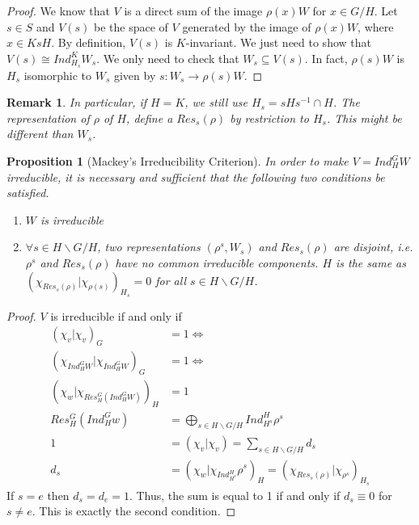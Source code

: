 \documentclass[letterpaper, leqno, 12pt]{article}
\newcommand{\fin}{\qquad \quad \hfill \framebox[1.75mm][l]{\,}}
\theoremstyle{stdthm}
\newtheorem{prop}[thm]{Proposition}
\theoremstyle{stddef}
\newtheorem{rem}[thm]{Remark} %
\theoremstyle{stdnonum}
\theoremstyle{stdqands}
\theoremstyle{stdbold}
\begin{document}
\begin{proof}
We know that $V$ is a direct sum of the image $\rho(x)W$ for $x \in G/H$. Let $s \in S$ and $V(s)$ be the space of $V$ generated by the image of $\rho(x)W$, where $x \in KsH$. By definition, $V(s)$ is $K$-invariant. We just need to show that $V(s) \cong Ind_{H_s}^K W_s$. We only need to check that $W_s \subseteq V(s)$. In fact, $\rho(s)W$ is $H_s$ isomorphic to $W_s$ given by $s: W_s \rightarrow \rho(s)W$. 
\end{proof}

\begin{rem}
 In particular, if $H = K$, we still use $H_s = sHs^{-1} \cap H$. The representation of $\rho$ of $H$, define a $Res_s(\rho)$ by restriction to $H_s$. This might be different than $W_s$. 
\end{rem}

\begin{prop} [Mackey's Irreducibility Criterion]
In order to make $V = Ind_H^G W$ irreducible, it is necessary and sufficient that the following two conditions be satisfied. 
\begin{enumerate}
\item $W$ is irreducible
\item $\forall s \in H\backslash G /H$, two representations $(\rho^s, W_s)$ and $Res_s(\rho)$ are disjoint, i.e. $\rho^s$ and $Res_s(\rho)$ have no common irreducible components. $H$ is the same as $(\chi_{Res_s(\rho)}| \chi_{\rho(s)})_{H_s} = 0$ for all $s \in H\backslash G/H$.
\end{enumerate}
\end{prop}

\begin{proof}
$V$ is irreducible if and only if
\begin{align*}
(\chi_v|\chi_v)_G &= 1 \Leftrightarrow\\
(\chi_{Ind_H^G W}| \chi_{Ind_H^G W})_G &=1 \Leftrightarrow\\
(\chi_w| \chi_{Res_H^G(Ind_H^G W)})_H &= 1\\
Res_H^G(Ind_H^G w) &= \bigoplus_{s \in H \backslash G / H} Ind_{H^s}^H \rho^s \\
1&= (\chi_v|\chi_v) = \sum_{s \in H\backslash G / H} d_s\\
d_s &=  (\chi_w| \chi_{Ind_{H^s}^H} \rho^s)_H = (\chi_{Res_s(\rho)}|\chi_{\rho^s})_{H_s}
\end{align*}
If $s = e$ then $d_s = d_e = 1$. Thus, the sum is equal to 1 if and only if $d_s \equiv 0$ for $s \neq e$. This is exactly the second condition. 
\end{proof}
\end{document}
